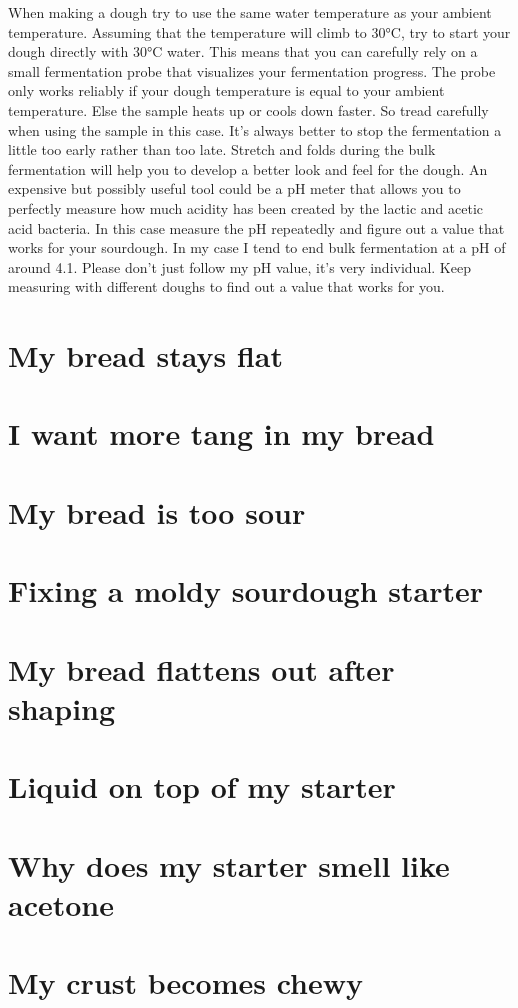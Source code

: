 When making a dough try to use the same water temperature
as your ambient temperature. Assuming that the temperature
will climb to 30°C, try to start your dough directly
with 30°C water. This means that you can carefully rely on
a small fermentation probe that visualizes your fermentation
progress. The probe only works reliably if your dough temperature
is equal to your ambient temperature. Else the sample heats
up or cools down faster. So tread carefully when using
the sample in this case. It's always better to stop
the fermentation a little too early rather than too late.
Stretch and folds during the bulk fermentation
will help you to develop a better look and feel for
the dough. An expensive but possibly useful tool
could be a pH meter that allows you to perfectly
measure how much acidity has been created by the
lactic and acetic acid bacteria. In this case measure
the pH repeatedly and figure out a value that works
for your sourdough. In my case I tend to end bulk
fermentation at a pH of around 4.1. Please don't just
follow my pH value, it's very individual. Keep measuring
with different doughs to find out a value that works for you.

\section{My bread stays flat}
\section{I want more tang in my bread}
\section{My bread is too sour}
\section{Fixing a moldy sourdough starter}
\section{My bread flattens out after shaping}
\section{Liquid on top of my starter}
\section{Why does my starter smell like acetone}
\section{My crust becomes chewy}